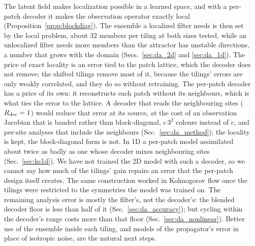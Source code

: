  The latent field makes localization possible in a
learned space, and with a per-patch decoder it makes the observation
operator exactly local (Proposition~\ref{prop:blockdiag}). The ensemble a localized filter needs is
then set by the local problem, about 32 members per tiling at both sizes
tested, while an unlocalized filter needs more members than the attractor
has unstable directions, a number that grows with the domain
(Secs.~\ref{sec:da_2d} and \ref{sec:da_1d}). The price of exact locality is
an error tied to the patch lattice, which the decoder does not remove; the
shifted tilings remove most of it, because the tilings' errors are only
weakly correlated, and they do so without retraining. The per-patch decoder
has a price of its own: it reconstructs each patch without its neighbours,
which is what ties the error to the lattice. A decoder that reads the
neighbouring sites ($R_{\mathrm{dec}}=1$) would reduce that error at its source, at the
cost of an observation Jacobian that is banded rather than block-diagonal,
$c\,3^{2}$ colours instead of $c$, and per-site analyses that include the
neighbours (Sec.~\ref{sec:da_method}); the locality is kept, the
block-diagonal form is not. In 1D a per-patch model assimilated about twice
as badly as one whose decoder mixes neighbouring sites
(Sec.~\ref{sec:ks1d}). We have not trained the 2D model with such a decoder,
so we cannot say how much of the tilings' gain repairs an error that the
per-patch design itself creates. The same
construction worked in Kolmogorov flow once the tilings were restricted to
the symmetries the model was trained on. The remaining analysis error is
mostly the filter's, not the decoder's: the blended decoder floor is less
than half of it (Sec.~\ref{sec:da_accuracy}); but cycling within the decoder's
range costs more than that floor (Sec.~\ref{sec:da_nonlinear}). Better use of the ensemble
inside each tiling, and models of the propagator's error in place of
isotropic noise, are the natural next steps.

